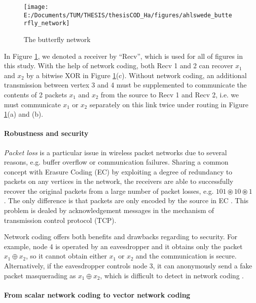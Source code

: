 \begin{figure}[H]
\caption{The butterfly network \label{fig:The-butterfly-network}}

\centering{}\texttt{[image: E:/Documents/TUM/THESIS/thesisCOD\_Ha/figures/ahlswede\_butterfly\_network]}
\end{figure}

In Figure \ref{fig:The-butterfly-network}, we denoted a receiver
by ``Recv'', which is used for all of figures in this study. With
the help of network coding, both Recv 1 and 2 can recover $x_{1}$
and $x_{2}$ by a bitwise XOR in Figure \ref{fig:The-butterfly-network}(c).
Without network coding, an additional transmission between vertex
3 and 4 must be supplemented to communicate the contents of 2 packets
$x_{1}$ and $x_{2}$ from the source to Recv 1 and Recv 2, i.e. we
must communicate $x_{1}$ or $x_{2}$ separately on this link twice
under routing in Figure \ref{fig:The-butterfly-network}(a) and (b). 

\paragraph{Robustness and security}

\textit{Packet loss} is a particular issue in wireless packet networks
due to several reasons, e.g. buffer overflow or communication failures.
Sharing a common concept with Erasure Coding (EC) by exploiting a
degree of redundancy to packets on any vertices in the network, the
receivers are able to successfully recover the original packets from
a large number of packet losses, e.g. $101\circledast10\circledast1$.
The only difference is that packets are only encoded by the source
in EC \cite{Fujimura:2008}. This problem is dealed by acknowledgement
messages in the mechanism of transmission control protocol (TCP).

Network coding offers both benefits and drawbacks regarding to security.
For example, node 4 is operated by an eavesdropper and it obtains
only the packet $x_{1}\oplus x_{2}$, so it cannot obtain either $x_{1}$
or $x_{2}$ and the communication is secure. Alternatively, if the
eavesdropper controls node 3, it can anonymously send a fake packet
masquerading as $x_{1}\oplus x_{2}$, which is difficult to detect
in network coding \cite{Ho:2008}.

\paragraph{From scalar network coding to vector network coding}

